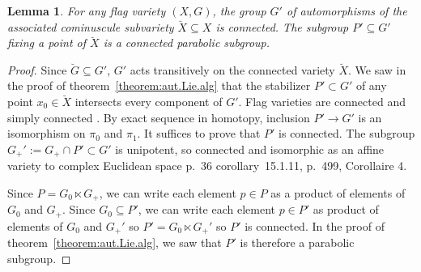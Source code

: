 \documentclass[a4paper,10pt]{amsart}
\newtheorem{lemma}{Lemma}
\theoremstyle{remark}
\begin{document}
\begin{lemma}
For any flag variety \((X,G)\), the group \(G'\) of automorphisms of the associated cominuscule subvariety \(\breve{X}\subseteq X\) is connected.
The subgroup \(P'\subseteq G'\) fixing a point of \(\breve{X}\) is a connected parabolic subgroup.
\end{lemma}
\begin{proof}
Since \(\breve{G}\subseteq G'\), \(G'\) acts transitively on the connected variety \(\breve{X}\).
We saw in the proof of theorem~\vref{theorem:aut.Lie.alg} that the stabilizer \(P'\subset G'\) of any point \(x_0\in\breve{X}\) intersects every component of \(G'\).
Flag varieties are connected and simply connected \cite{Borel:1954}.
By exact sequence in homotopy, inclusion \(P'\to G'\) is an isomorphism on \(\pi_0\) and \(\pi_1\).
It suffices to prove that \(P'\) is connected.
The subgroup \(G_+':=G_+\cap P'\subset G'\) is unipotent, so connected and isomorphic as an affine variety to complex Euclidean space \cite{Conrad:2017} p.~36 corollary~15.1.11, \cite{Demazure/Gabriel:1970} p.~499, Corollaire 4.

Since \(P=G_0\ltimes G_+\), we can write each element \(p\in P\) as a product of elements of \(G_0\) and \(G_+\).
Since \(G_0\subseteq P'\), we can write each element \(p\in P'\) as product of elements of \(G_0\) and \(G_+'\) so \(P'=G_0\ltimes G_+'\) so \(P'\) is connected.
In the proof of theorem~\vref{theorem:aut.Lie.alg}, we saw that \(P'\) is therefore a parabolic subgroup.
\end{proof}
\end{document}
